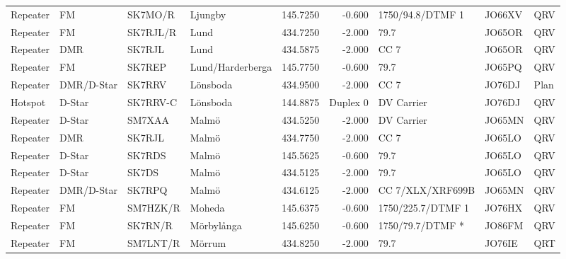 \begin{landscape}
\begin{longtable}{llllrrlll}
	Repeater          & FM              & SK7MO/R  & Ljungby              &     145.7250 &     -0.600 & 1750/94.8/DTMF 1  & JO66XV      & QRV      \\
	Repeater          & FM              & SK7RJL/R & Lund                 &     434.7250 &     -2.000 & 79.7              & JO65OR      & QRV      \\
	Repeater          & DMR             & SK7RJL   & Lund                 &     434.5875 &     -2.000 & CC 7              & JO65OR      & QRV      \\
	Repeater          & FM              & SK7REP   & Lund/Harderberga     &     145.7750 &     -0.600 & 79.7              & JO65PQ      & QRV      \\
	Repeater          & DMR/D-Star      & SK7RRV   & Lönsboda             &     434.9500 &     -2.000 & CC 7              & JO76DJ      & Plan     \\
	Hotspot           & D-Star          & SK7RRV-C & Lönsboda             &     144.8875 &   Duplex 0 & DV Carrier        & JO76DJ      & QRV      \\
	Repeater          & D-Star          & SM7XAA   & Malmö                &     434.5250 &     -2.000 & DV Carrier        & JO65MN      & QRV      \\
	Repeater          & DMR             & SK7RJL   & Malmö                &     434.7750 &     -2.000 & CC 7              & JO65LO      & QRV      \\
	Repeater          & D-Star          & SK7RDS   & Malmö                &     145.5625 &     -0.600 & 79.7              & JO65LO      & QRV      \\
	Repeater          & D-Star          & SK7DS    & Malmö                &     434.5125 &     -2.000 & 79.7              & JO65LO      & QRV      \\
	Repeater          & DMR/D-Star      & SK7RPQ   & Malmö                &     434.6125 &     -2.000 & CC 7/XLX/XRF699B  & JO65MN      & QRV      \\
	Repeater          & FM              & SM7HZK/R & Moheda               &     145.6375 &     -0.600 & 1750/225.7/DTMF 1 & JO76HX      & QRV      \\
	Repeater          & FM              & SK7RN/R  & Mörbylånga           &     145.6250 &     -0.600 & 1750/79.7/DTMF *  & JO86FM      & QRV      \\
	Repeater          & FM              & SM7LNT/R & Mörrum               &     434.8250 &     -2.000 & 79.7              & JO76IE      & QRT      \\

\end{longtable}
\end{landscape}
